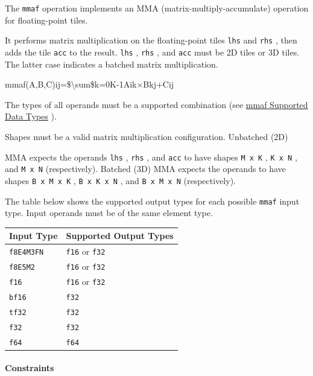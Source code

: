 \documentclass{article}
\begin{document}
The \texttt{mmaf} operation implements an MMA (matrix-multiply-accumulate) operation for floating-point tiles.

It performs matrix multiplication on the floating-point tiles \texttt{lhs} and \texttt{rhs} , then adds the tile \texttt{acc} to the result. \texttt{lhs} , \texttt{rhs} , and \texttt{acc} must be 2D tiles or 3D tiles. The latter case indicates a batched matrix multiplication.


mmaf(A,B,C)ij=\$\textbackslash{}sum\$k=0K-1Aik×Bkj+Cij

The types of all operands must be a supported combination (see \href{https://docs.nvidia.com/cuda/tile-ir/latest/sections/operations.html#table-cuda-tile-mmaf-0}{mmaf Supported Data Types} ).


Shapes must be a valid matrix multiplication configuration. Unbatched (2D)

MMA expects the operands \texttt{lhs} , \texttt{rhs} , and \texttt{acc} to have shapes \texttt{M x K} , \texttt{K x N} , and \texttt{M x N} (respectively). Batched (3D) MMA expects the operands to have shapes \texttt{B x M x K} , \texttt{B x K x N} , and \texttt{B x M x N} (respectively).


The table below shows the supported output types for each possible \texttt{mmaf} input type. Input operands must be of the same element type.


\begin{longtable}{l|l}
\hline
Input Type & Supported Output Types \\ \hline
\texttt{f8E4M3FN} & \texttt{f16} or \texttt{f32} \\ \hline
\texttt{f8E5M2} & \texttt{f16} or \texttt{f32} \\ \hline
\texttt{f16} & \texttt{f16} or \texttt{f32} \\ \hline
\texttt{bf16} & \texttt{f32} \\ \hline
\texttt{tf32} & \texttt{f32} \\ \hline
\texttt{f32} & \texttt{f32} \\ \hline
\texttt{f64} & \texttt{f64} \\ \hline
\end{longtable}


\paragraph{Constraints}
\end{document}
